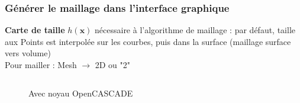 \documentclass[aspectratio=169]{beamer}
\begin{document}
\begin{frame}[fragile]
\frametitle{Générer le maillage dans l'interface graphique}
\textbf{Carte de taille} $h(\mathbf{x})$ nécessaire à l'algorithme de maillage : par défaut, taille aux Points est interpolée sur les courbes, puis dans la surface (maillage surface vers volume)\\
Pour mailler : Mesh $\rightarrow$ 2D ou "2"
\begin{columns}
  \begin{column}{0.5\textwidth}
    \begin{figure}
      \centering
      \caption{Avec noyau OpenCASCADE}
    \end{figure}
  \end{column}
  \begin{column}{0.5\textwidth}
    \begin{figure}
      \centering
\end{figure}
\end{column}
\end{columns}
\end{frame}
\end{document}

